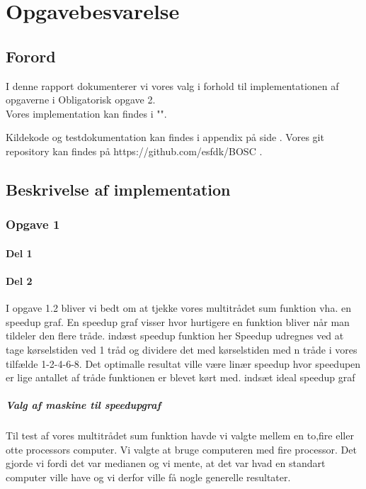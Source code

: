 \chapter{Opgavebesvarelse}
\section{Forord}
I denne rapport dokumenterer vi vores valg i forhold til implementationen af opgaverne i Obligatorisk opgave 2.
\\Vores implementation kan findes i "".

Kildekode og testdokumentation kan findes i appendix på side \pageref{Appendix}. Vores git repository kan findes på https://github.com/esfdk/BOSC .

\section{}

\section{Beskrivelse af implementation}
\subsection{Opgave 1}
\label{O1}

\subsubsection{Del 1}
\label{O1_1}

\subsubsection{Del 2}
\label{O1_2}
I opgave 1.2 bliver vi bedt om at tjekke vores multitrådet sum funktion vha. en speedup graf.
En speedup graf visser hvor hurtigere en funktion bliver når man tildeler den flere tråde. 
indæst speedup funktion her\n\n
Speedup udregnes ved at tage kørselstiden ved 1 tråd og dividere det med kørselstiden med n tråde i vores tilfælde 1-2-4-6-8. Det optimalle resultat ville være linær speedup hvor speedupen er lige antallet af tråde funktionen er blevet kørt med.
indsæt ideal speedup graf

\paragraph{Valg af maskine til speedupgraf}
Til test af vores multitrådet sum funktion havde vi valgte mellem en to,fire eller otte processors computer. Vi valgte at bruge computeren med fire processor. Det gjorde vi fordi det var medianen og vi mente, at det var hvad en standart computer ville have og vi derfor ville få nogle generelle resultater. 


